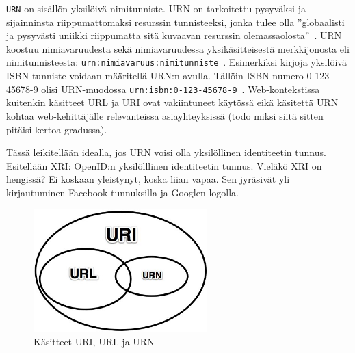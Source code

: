 \documentclass[finnish,gradu]{tktltiki}
\begin{document}
  \verb!URN! on sisällön yksilöivä nimitunniste. URN on tarkoitettu pysyväksi ja sijainninsta riippumattomaksi resurssin tunnisteeksi, jonka tulee olla ''globaalisti ja pysyvästi uniikki riippumatta sitä kuvaavan resurssin olemassaolosta''~\cite{ietf_rfc_uri_syntax}. URN koostuu nimiavaruudesta sekä nimiavaruudessa yksikäsitteisestä merkkijonosta eli nimitunnisteesta: \verb!urn:nimiavaruus:nimitunniste!~\cite{ietf_rfc_urn_syntax}. Esimerkiksi kirjoja yksilöivä ISBN-tunniste voidaan määritellä URN:n avulla. Tällöin ISBN-numero 0-123-45678-9 olisi URN-muodossa \verb!urn:isbn:0-123-45678-9!~\cite{w3c_uri_clarifications}. Web-kontekstissa kuitenkin käsitteet URL ja URI ovat vakiintuneet käytössä eikä käsitettä URN kohtaa web-kehittäjälle relevanteissa asiayhteyksissä (todo miksi siitä sitten pitäisi kertoa gradussa).

  Tässä leikitellään idealla, jos URN voisi olla yksilöllinen identiteetin tunnus. Esitellään XRI: OpenID:n yksilölllinen identiteetin tunnus. Vieläkö XRI on hengissä? Ei koskaan yleistynyt, koska liian vapaa. Sen jyräsivät yli kirjautuminen Facebook-tunnuksilla ja Googlen logolla.

  \begin{figure}
    \centering
    \includegraphics[width=0.6\textwidth]{images/uri_url_urn.jpg}
    \caption{Käsitteet URI, URL ja URN}
    \label{fig:uri_url_urn}
  \end{figure}



\end{document}
